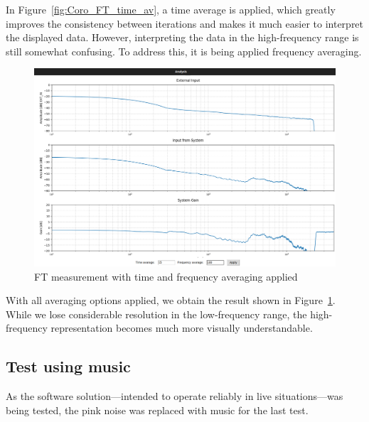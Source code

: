 In Figure~\ref{fig:Coro_FT_time_av}, a time average is applied, which greatly improves the consistency between iterations and makes it much easier to interpret the displayed data. However, interpreting the data in the high-frequency range is still somewhat confusing. To address this, it is being applied frequency averaging.

\begin{figure}[H]
	\centering
	\includegraphics[width=0.8
	\linewidth]{Figures/Coro_FT_WITH_av.png}
	\caption{FT measurement with time and frequency averaging applied}
	\label{fig:Coro_FT_av}
\end{figure}

With all averaging options applied, we obtain the result shown in Figure~\ref{fig:Coro_FT_av}. While we lose considerable resolution in the low-frequency range, the high-frequency representation becomes much more visually understandable.


\subsection{Test using music}

As the software solution—intended to operate reliably in live situations—was being tested, the pink noise was replaced with music for the last test.

